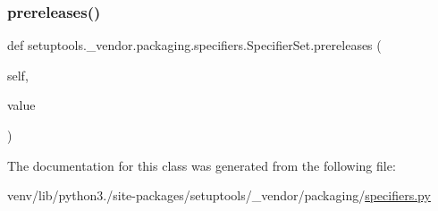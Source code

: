 \mbox{\label{classsetuptools_1_1__vendor_1_1packaging_1_1specifiers_1_1SpecifierSet_af4a00d47a94e0ec77eca7ceccd9f752d}} 
\subsubsection{\texorpdfstring{prereleases()}{prereleases()}\hspace{0.1cm}{\footnotesize\ttfamily [2/2]}}
{\footnotesize\ttfamily def setuptools.\+\_\+vendor.\+packaging.\+specifiers.\+Specifier\+Set.\+prereleases (\begin{DoxyParamCaption}\item[{}]{self,  }\item[{}]{value }\end{DoxyParamCaption})}



The documentation for this class was generated from the following file\+:\begin{DoxyCompactItemize}
\item 
venv/lib/python3./site-\/packages/setuptools/\+\_\+vendor/packaging/\hyperlink{setuptools_2__vendor_2packaging_2specifiers_8py}{specifiers.\+py}\end{DoxyCompactItemize}
